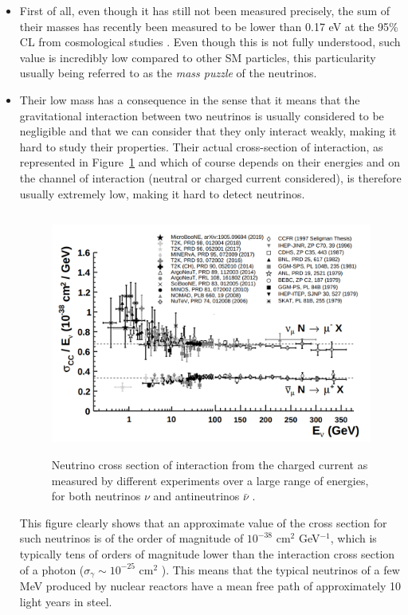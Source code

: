 \documentclass[a4paper, 10pt, openright]{report}
\begin{document}
\begin{itemize}
\item First of all, even though it has still not been measured precisely, the sum of their masses has recently been measured to be lower than 0.17 eV at the 95\% \ac{CL} from cosmological studies \cite{NeutrinoMass}. Even though this is not fully understood, such value is incredibly low compared to other \ac{SM} particles, this particularity usually being referred to as the \textit{mass puzzle} of the neutrinos. 

\item Their low mass has a consequence in the sense that it means that the gravitational interaction between two neutrinos is usually considered to be negligible and that we can consider that they only interact weakly, making it hard to study their properties. Their actual cross-section of interaction, as represented in Figure~\ref{fig:NeutrinoXS} and which of course depends on their energies and on the channel of interaction (neutral or charged current considered), is therefore usually extremely low, making it hard to detect neutrinos.

\begin{figure}[htbp]
\begin{center}
\includegraphics[width=12cm, height=8cm]{figs/NeutrinoXS.png}
\caption{Neutrino cross section of interaction from the charged current as measured by different experiments over a large range of energies, for both neutrinos $\nu$ and antineutrinos $\bar \nu$ \cite{PDGNeutrino}.}
\label{fig:NeutrinoXS}
\end{center}
\end{figure}

This figure clearly shows that an approximate value of the cross section for such neutrinos is of the order of magnitude of $10^{-38}$ cm$^2$ GeV$^{-1}$, which is typically tens of orders of magnitude lower than the interaction cross section of a photon ($\sigma_\gamma \sim 10^{-25}$ cm$^2$ \cite{GammaXS}). This means that the typical neutrinos of a few MeV produced by nuclear reactors have a mean free path of approximately 10 light years in steel.  


\end{itemize}
\end{document}
